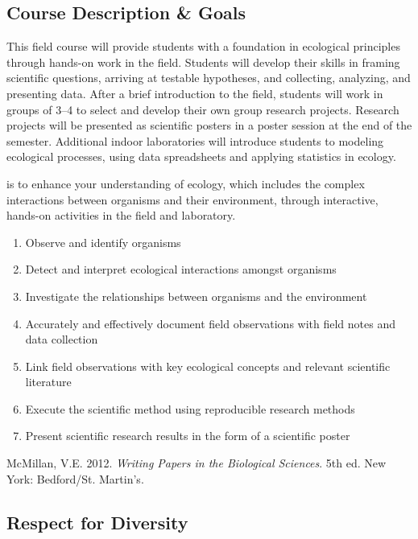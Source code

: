 \documentclass{tufte-handout}
\begin{document}
\begin{fullwidth}

\section{Course Description \& Goals}

This field course will provide students with a foundation in ecological principles through hands-on work in the field. Students will develop their skills in framing scientific questions, arriving at testable hypotheses, and collecting, analyzing, and presenting data. After a brief introduction to the field, students will work in groups of 3--4 to select and develop their own group research projects. Research projects will be presented as scientific posters in a poster session at the end of the semester. Additional indoor laboratories will introduce students to modeling ecological processes, using data spreadsheets and applying statistics in ecology.

 is to enhance your understanding of ecology, which includes the complex interactions between organisms and their environment, through interactive, hands-on activities in the field and laboratory. 


\begin{enumerate}
	\item Observe and identify organisms
	\item Detect and interpret ecological interactions amongst organisms
	\item Investigate the relationships between organisms and the environment
	\item Accurately and effectively document field observations with field notes and data collection
	\item Link field observations with key ecological concepts and relevant scientific literature
	\item Execute the scientific method using reproducible research methods
	\item Present scientific research results in the form of a scientific poster
\end{enumerate}

 McMillan, V.E. 2012. \emph{Writing Papers in the Biological Sciences}. 5th ed. New York: Bedford/St. Martin's.

\subsection{Respect for Diversity}


\end{fullwidth}
\end{document}

